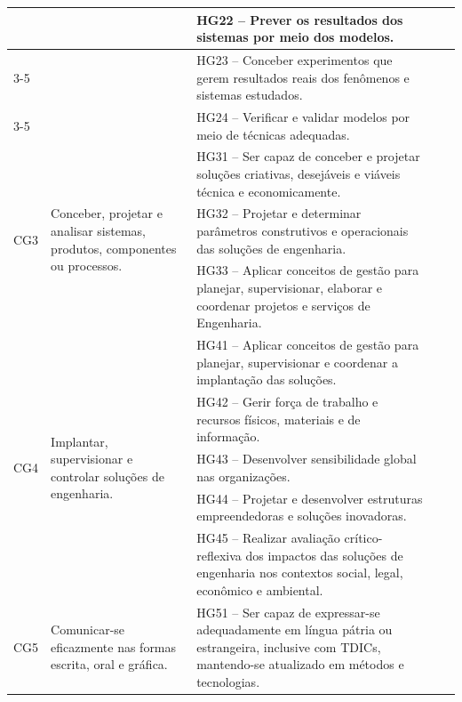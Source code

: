 \begin{landscape}
\begin{longtable}{m{1cm} m{5cm} m{8cm} m{5cm} m{5cm}}
		&
		& HG22 – Prever os resultados dos sistemas por meio dos modelos.
		&
		&
		\\ \cline{3-5}
		
		&
		& HG23 – Conceber experimentos que gerem resultados reais dos fenômenos e sistemas estudados.
		&
		&
		\\ \cline{3-5}
		
		&
		& HG24 – Verificar e validar modelos por meio de técnicas adequadas.
		&
		&
		\\ \hline
		
		
		\multirow{3}{*}{CG3} &
		\multirow{3}{5cm}{Conceber, projetar e analisar sistemas, produtos, componentes ou processos.}
		& HG31 – Ser capaz de conceber e projetar soluções criativas, desejáveis e viáveis técnica e economicamente.
		&
		&
		\\ \cline{3-5}
		
		&
		& HG32 – Projetar e determinar parâmetros construtivos e operacionais das soluções de engenharia.
		&
		&
		\\ \cline{3-5}
		
		&
		& HG33 – Aplicar conceitos de gestão para planejar, supervisionar, elaborar e coordenar projetos e serviços de Engenharia.
		&
		&
		\\ \hline
		
		
		\multirow{5}{*}{CG4} &
		\multirow{5}{5cm}{Implantar, supervisionar e controlar soluções de engenharia.}
		& HG41 – Aplicar conceitos de gestão para planejar, supervisionar e coordenar a implantação das soluções.
		&
		&
		\\ \cline{3-5}
		
		&
		& HG42 – Gerir força de trabalho e recursos físicos, materiais e de informação.
		&
		&
		\\ \cline{3-5}
		
		&
		& HG43 – Desenvolver sensibilidade global nas organizações.
		&
		&
		\\ \cline{3-5}
		
		&
		& HG44 – Projetar e desenvolver estruturas empreendedoras e soluções inovadoras.
		&
		&
		\\ \cline{3-5}
		
		&
		& HG45 – Realizar avaliação crítico-reflexiva dos impactos das soluções de engenharia nos contextos social, legal, econômico e ambiental.
		&
		&
		\\ \hline
		
		
		\multirow{1}{*}{CG5} &
		\multirow{1}{5cm}{Comunicar-se eficazmente nas formas escrita, oral e gráfica.}
		& HG51 – Ser capaz de expressar-se adequadamente em língua pátria ou estrangeira, inclusive com TDICs, mantendo-se atualizado em métodos e tecnologias.
		&
		&
		\\ \hline
		

\end{longtable}
\end{landscape}
